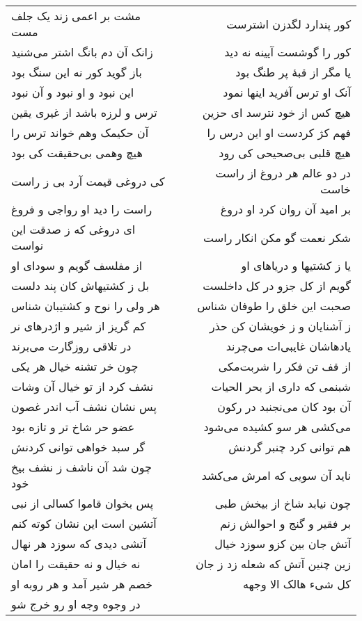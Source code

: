 \begin{center}
\begin{longtable}{l p{0.5cm} r}
مشت بر اعمی زند یک جلف مست
&&
کور پندارد لگدزن اشترست
\\
زانک آن دم بانگ اشتر می‌شنید
&&
کور را گوشست آیینه نه دید
\\
باز گوید کور نه این سنگ بود
&&
یا مگر از قبهٔ پر طنگ بود
\\
این نبود و او نبود و آن نبود
&&
آنک او ترس آفرید اینها نمود
\\
ترس و لرزه باشد از غیری یقین
&&
هیچ کس از خود نترسد ای حزین
\\
آن حکیمک وهم خواند ترس را
&&
فهم کژ کردست او این درس را
\\
هیچ وهمی بی‌حقیقت کی بود
&&
هیچ قلبی بی‌صحیحی کی رود
\\
کی دروغی قیمت آرد بی ز راست
&&
در دو عالم هر دروغ از راست خاست
\\
راست را دید او رواجی و فروغ
&&
بر امید آن روان کرد او دروغ
\\
ای دروغی که ز صدقت این نواست
&&
شکر نعمت گو مکن انکار راست
\\
از مفلسف گویم و سودای او
&&
یا ز کشتیها و دریاهای او
\\
بل ز کشتیهاش کان پند دلست
&&
گویم از کل جزو در کل داخلست
\\
هر ولی را نوح و کشتیبان شناس
&&
صحبت این خلق را طوفان شناس
\\
کم گریز از شیر و اژدرهای نر
&&
ز آشنایان و ز خویشان کن حذر
\\
در تلاقی روزگارت می‌برند
&&
یادهاشان غایبی‌ات می‌چرند
\\
چون خر تشنه خیال هر یکی
&&
از قف تن فکر را شربت‌مکی
\\
نشف کرد از تو خیال آن وشات
&&
شبنمی که داری از بحر الحیات
\\
پس نشان نشف آب اندر غصون
&&
آن بود کان می‌نجنبد در رکون
\\
عضو حر شاخ تر و تازه بود
&&
می‌کشی هر سو کشیده می‌شود
\\
گر سبد خواهی توانی کردنش
&&
هم توانی کرد چنبر گردنش
\\
چون شد آن ناشف ز نشف بیخ خود
&&
ناید آن سویی که امرش می‌کشد
\\
پس بخوان قاموا کسالی از نبی
&&
چون نیابد شاخ از بیخش طبی
\\
آتشین است این نشان کوته کنم
&&
بر فقیر و گنج و احوالش زنم
\\
آتشی دیدی که سوزد هر نهال
&&
آتش جان بین کزو سوزد خیال
\\
نه خیال و نه حقیقت را امان
&&
زین چنین آتش که شعله زد ز جان
\\
خصم هر شیر آمد و هر روبه او
&&
کل شیء هالک الا وجهه
\\
در وجوه وجه او رو خرج شو

\end{longtable}
\end{center}

